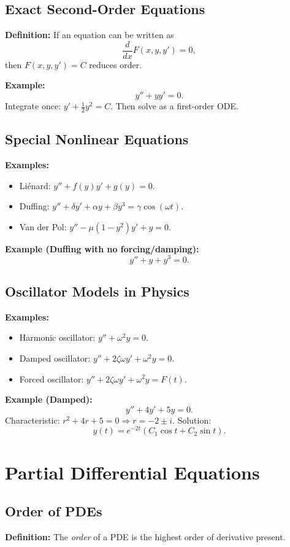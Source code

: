 \documentclass[12pt]{book}
\begin{document}
\chapter{Exact Second-Order Equations}
\textbf{Definition:}
If an equation can be written as
\[
\frac{d}{dx}F(x,y,y')=0,
\]
then $F(x,y,y')=C$ reduces order.

\textbf{Example:}
\[
y'' + y y' = 0.
\]
Integrate once: $y' + \tfrac{1}{2}y^2 = C$. Then solve as a first-order ODE.

\chapter{Special Nonlinear Equations}
\textbf{Examples:}
\begin{itemize}
  \item Liénard: $y'' + f(y)y' + g(y)=0$.
  \item Duffing: $y'' + \delta y' + \alpha y + \beta y^3 = \gamma \cos(\omega t)$.
  \item Van der Pol: $y'' - \mu(1-y^2)y' + y = 0$.
\end{itemize}

\textbf{Example (Duffing with no forcing/damping):}
\[
y'' + y + y^3 = 0.
\]

\chapter{Oscillator Models in Physics}
\textbf{Examples:}
\begin{itemize}
  \item Harmonic oscillator: $y'' + \omega^2 y = 0$.
  \item Damped oscillator: $y'' + 2\zeta \omega y' + \omega^2 y = 0$.
  \item Forced oscillator: $y'' + 2\zeta \omega y' + \omega^2 y = F(t)$.
\end{itemize}

\textbf{Example (Damped):}
\[
y'' + 4 y' + 5 y = 0.
\]
Characteristic: $r^2+4r+5=0 \Rightarrow r=-2 \pm i$.  
Solution:
\[
y(t)=e^{-2t}(C_1\cos t + C_2\sin t).
\]

\backmatter

\part{Partial Differential Equations}

\chapter{Order of PDEs}
\textbf{Definition:} The \emph{order} of a PDE is the highest order of derivative present.
\end{document}
